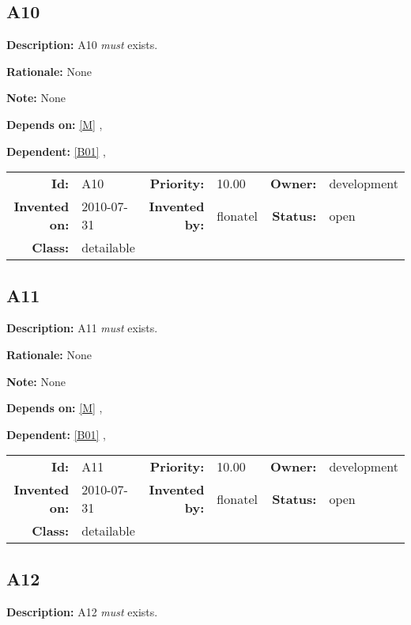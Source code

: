 \subsection{A10}\label{A10}
\textbf{Description:} A10 \textsl{must} exists.

\textbf{Rationale:} None

\textbf{Note:} None

\textbf{Depends on:} \ref{M} , 

\textbf{Dependent:} \ref{B01} , 

\par
{\small \begin{center}\begin{tabular}{rlrlrl}
\textbf{Id:} & A10 & \textbf{Priority:} & 10.00 & \textbf{Owner:} & development \\ 
\textbf{Invented on:} & 2010-07-31 & \textbf{Invented by:} & flonatel & \textbf{Status:} & open \\ 
\textbf{Class:} & detailable & & & & \\ 
\end{tabular}\end{center} }%
\subsection{A11}\label{A11}
\textbf{Description:} A11 \textsl{must} exists.

\textbf{Rationale:} None

\textbf{Note:} None

\textbf{Depends on:} \ref{M} , 

\textbf{Dependent:} \ref{B01} , 

\par
{\small \begin{center}\begin{tabular}{rlrlrl}
\textbf{Id:} & A11 & \textbf{Priority:} & 10.00 & \textbf{Owner:} & development \\ 
\textbf{Invented on:} & 2010-07-31 & \textbf{Invented by:} & flonatel & \textbf{Status:} & open \\ 
\textbf{Class:} & detailable & & & & \\ 
\end{tabular}\end{center} }%
\subsection{A12}\label{A12}
\textbf{Description:} A12 \textsl{must} exists.

